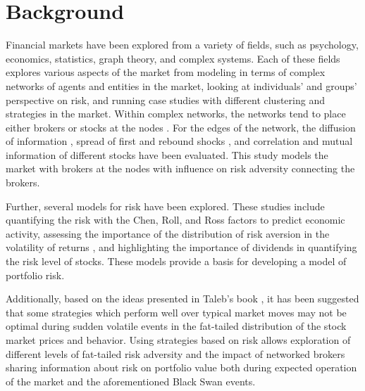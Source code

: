 \documentclass[letterpaper, 11 pt, proceedings]{IEEEtran}
\begin{document}
	\section{Background}\label{sec:background}
	Financial markets have been explored from a variety of fields, such as psychology, economics, statistics, graph theory, and complex systems. Each of these fields explores various aspects of the market  from modeling in terms of complex networks of agents and entities in the market, looking at individuals' and groups' perspective on risk, and running case studies with different clustering and strategies in the market. Within complex networks, the networks tend to place either brokers or stocks at the nodes \cite{baydelli_hierarchicalmarket,kulmann_marketscomplexsystems,dimaggio_relevancebrokernetworks}. For the edges of the network, the diffusion of information \cite{dimaggio_relevancebrokernetworks}, spread of first and rebound shocks \cite{gai_contagion}, and correlation and mutual information of different stocks \cite{li_correlation, fiedor_networksmutualinformationrate} have been evaluated. This study models the market with brokers at the nodes with influence on risk adversity connecting the brokers. 
	
	Further, several models for risk have been explored. These studies include quantifying the risk with the Chen, Roll, and Ross factors \cite{cooper_realinvestmentandrisk} to predict economic activity, assessing the importance of the distribution of risk aversion in the volatility of returns \cite{lansing_riskaversion}, and highlighting the importance of dividends in quantifying the risk level of stocks. These models provide a basis for developing a model of portfolio risk.
	
	Additionally, based on the ideas presented in Taleb's book \cite{taleb_antifragile}, it has been suggested that some strategies which perform well over typical market moves may not be optimal during sudden volatile events in the fat-tailed distribution of the stock market prices and behavior. Using strategies based on risk allows exploration of different levels of fat-tailed risk adversity and the impact of networked brokers sharing information about risk on portfolio value both during expected operation of the market and the aforementioned Black Swan events.
	
	
\end{document}
